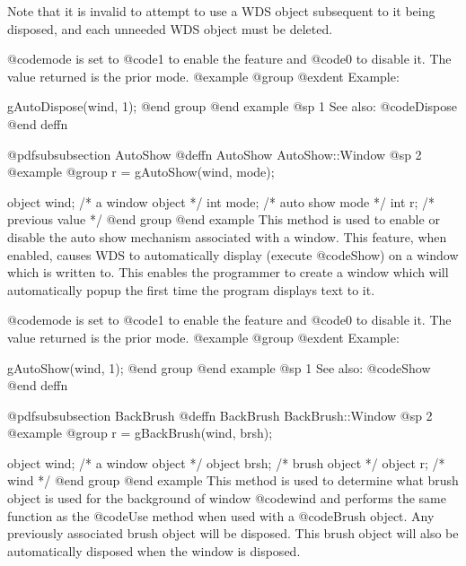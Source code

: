 Note that it is invalid to attempt to use a WDS object subsequent to it
being disposed, and each unneeded WDS object must be deleted.

@code{mode} is set to @code{1} to enable the feature and @code{0}
to disable it.  The value returned is the prior mode.
@example
@group
@exdent Example:

gAutoDispose(wind, 1);
@end group
@end example
@sp 1
See also:  @code{Dispose}
@end deffn











@pdfsubsubsection {AutoShow}
@deffn {AutoShow} AutoShow::Window
@sp 2
@example
@group
r = gAutoShow(wind, mode);

object   wind;     /*  a window object    */
int      mode;     /*  auto show mode     */
int      r;        /*  previous value     */
@end group
@end example
This method is used to enable or disable the auto show mechanism
associated with a window.  This feature, when enabled, causes WDS to
automatically display (execute @code{Show}) on a window which is written
to.  This enables the programmer to create a window which will automatically
popup the first time the program displays text to it.

@code{mode} is set to @code{1} to enable the feature and @code{0}
to disable it.  The value returned is the prior mode.
@example
@group
@exdent Example:

gAutoShow(wind, 1);
@end group
@end example
@sp 1
See also:  @code{Show}
@end deffn











@pdfsubsubsection {BackBrush}
@deffn {BackBrush} BackBrush::Window
@sp 2
@example
@group
r = gBackBrush(wind, brsh);

object  wind;   /*  a window object   */
object  brsh;   /*  brush object      */
object  r;      /*  wind              */
@end group
@end example
This method is used to determine what brush object is used for the
background of window @code{wind} and performs the same function as the
@code{Use} method when used with a @code{Brush} object.  Any previously
associated brush object will be disposed.  This brush object will also
be automatically disposed when the window is disposed.

